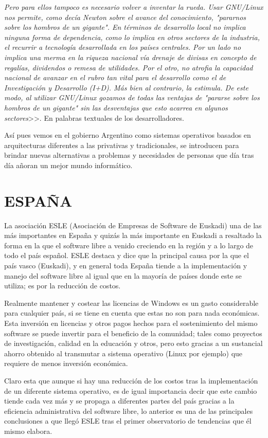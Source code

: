 \textit{ Pero para ellos tampoco es necesario volver a inventar la rueda. Usar GNU/Linux nos permite, como decía Newton sobre el avance del conocimiento, "pararnos sobre los 
hombros de un gigante". En términos de desarrollo local no implica ninguna forma de dependencia, como lo implica en otros sectores de la industria, el recurrir a tecnología 
desarrollada en los países centrales. Por un lado no implica una merma en la riqueza nacional vía drenaje de divisas en concepto de regalías, dividendos o remesa de utilidades. 
Por el otro, no atrofia la capacidad nacional de avanzar en el rubro tan vital para el desarrollo como el de Investigación y Desarrollo (I+D). Más bien al contrario, la estimula. 
De este modo, al utilizar GNU/Linux gozamos de todas las ventajas de "pararse sobre los hombros de un gigante" sin las desventajas que esto acarrea en algunos sectores}>>. En 
palabras textuales de los desarrolladores. 

Así pues vemos en el gobierno Argentino como sistemas operativos basados en arquitecturas diferentes a las privativas y tradicionales, se introducen para brindar nuevas 
alternativas a problemas y necesidades de personas que día tras día añoran un mejor mundo informático.


\section*{ESPAÑA}
La asociación ESLE (Asociación de Empresas de Software de Euskadi) una de las más importantes en España y quizás la más importante en Euskadi a resaltado la forma en la que el 
software libre a venido creciendo en la región y a lo largo de todo el país español. ESLE destaca y dice que la principal causa por la que el país vasco (Euskadi), y en general 
toda España tiende a la implementación y manejo del software libre al igual que en la mayoría de países donde este se utiliza; es por la reducción de costos.

Realmente mantener y costear las licencias de Windows es un gasto considerable para cualquier país, si se tiene en cuenta que estas no son para nada económicas. Esta inversión en 
licencias y otros pagos hechos para el sostenimiento del mismo software se puede invertir para el beneficio de  la comunidad; tales como proyectos de investigación, calidad en la 
educación y otros, pero esto gracias a un sustancial ahorro obtenido al transmutar a sistema operativo (Linux por ejemplo) que requiere de menos inversión económica.

Claro esta que aunque si hay una reducción  de los costos tras la implementación de un diferente sistema operativo, es de igual importancia decir que este cambio tiende cada vez 
más y se propaga a diferentes partes del país gracias a la eficiencia administrativa del software libre, lo anterior es una de las principales conclusiones a que llegó ESLE tras 
el primer observatorio de tendencias que él mismo elabora.

